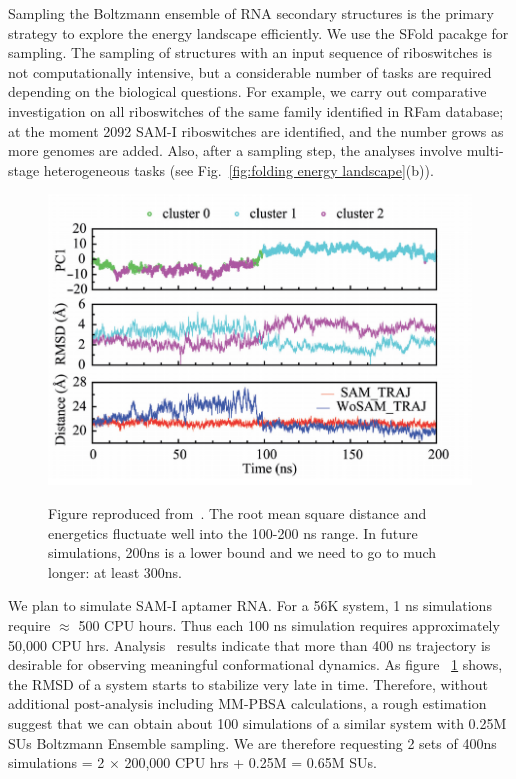 \documentclass[a4paper,11pt]{article}
\newcommand{\up}{\vspace*{-1em}}
\begin{document}
Sampling the Boltzmann ensemble of RNA secondary structures is the primary strategy to explore the energy landscape efficiently.  We use the SFold pacakge\cite{ding2006} for sampling. The sampling of structures with an input sequence of riboswitches is not computationally intensive, but a considerable number of tasks are required depending on the biological questions.  For example, we carry out comparative investigation on all riboswitches of the same family identified in RFam database; at the moment 2092 SAM-I riboswitches are identified, and the number grows as more genomes are added.  Also, after a sampling step, the analyses involve multi-stage heterogeneous tasks (see Fig.~\ref{fig:folding energy landscape}(b)).  


\begin{figure}%
\begin{center}
  \includegraphics[scale=0.4]{Figure3}
   \caption{ Figure reproduced from~\cite{SAM-I-NAR2009}. The root mean square distance and energetics fluctuate well into the 100-200 ns range. In future simulations, 200ns is a lower bound and we need to go to much longer: at least 300ns.
}
\up\up
\label{fig:Fig3}
\end{center}
\end{figure}

We plan to simulate SAM-I aptamer RNA. For a 56K system, 1 ns simulations require $\approx$ 500 CPU hours.  Thus each 100 ns simulation requires approximately 50,000 CPU hrs.  Analysis~\cite{SAM-I-NAR2009} results indicate that more than 400 ns trajectory is desirable for observing meaningful conformational dynamics. As figure ~\ref{fig:Fig3} shows, the RMSD of a system starts to stabilize very late in time. Therefore, without additional post-analysis including MM-PBSA calculations, a rough estimation suggest that we can obtain about 100 simulations of a similar system with 0.25M SUs 
Boltzmann Ensemble sampling.  We are therefore requesting
2 sets of 400ns simulations = 2 $\times$ 200,000 CPU hrs + 0.25M = 0.65M SUs.
\end{document}
